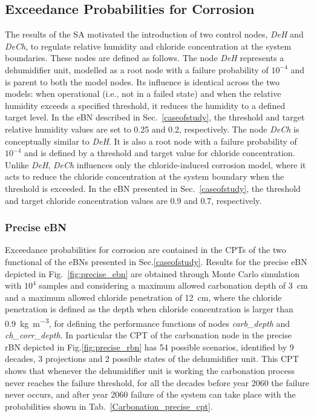 \subsection{Exceedance Probabilities for Corrosion}

The results of the SA motivated the introduction of two control nodes, \textit{DeH} and \textit{DeCh}, to regulate relative humidity and chloride concentration at the system boundaries. 
These nodes are defined as follows.
The node \textit{DeH} represents a dehumidifier unit, modelled as a root node with a failure probability of $10^{-4}$ and is parent to both the model nodes.
Its influence is identical across the two models: when operational (i.e., not in a failed state) and when the relative humidity exceeds a specified threshold, it reduces the humidity to a defined target level. 
In the eBN described in Sec.~\ref{caseofstudy}, the threshold and target relative humidity values are set to 0.25 and 0.2, respectively.
The node \textit{DeCh} is conceptually similar to \textit{DeH}.
It is also a root node with a failure probability of $10^{-4}$ and is defined by a threshold and target value for chloride concentration. 
Unlike \textit{DeH}, \textit{DeCh} influences only the chloride-induced corrosion model, where it acts to reduce the chloride concentration at the system boundary when the threshold is exceeded. 
In the eBN presented in Sec.~\ref{caseofstudy}, the threshold and target chloride concentration values are 0.9 and 0.7, respectively.\\

\subsubsection{Precise eBN}
Exceedance probabilities for corrosion are contained in the CPTs of the two functional of the eBNs presented in Sec.\ref{caseofstudy}. 
Results for the precise eBN depicted in Fig.~\ref{fig:precise_ebn} are obtained through Monte Carlo simulation with $10^4$ samples and considering a maximum allowed carbonation depth of \SI{3}{\centi\meter} and a maximum allowed chloride penetration of \SI{12}{\centi\meter}, where the chloride penetration is defined as the depth when chloride concentration is larger than \SI{0.9}{\kilogram\per\cubic\meter}, for defining the performance functions of nodes \textit{carb_depth} and \textit{ch_corr_depth}.
In particular the CPT of the carbonation node in the precise rBN depicted in Fig.\ref{fig:precise_rbn} has 54 possible scenarios, identified by 9 decades, 3 projections and 2 possible states of the dehumidifier unit. This CPT shows that whenever the dehumidifier unit is working the carbonation process never reaches the failure threshold, for all the decades before year 2060 the failure never occurs, and after year 2060 failure of the system can take place with the probabilities shown in Tab.~\ref{Carbonation_precise_cpt}.

